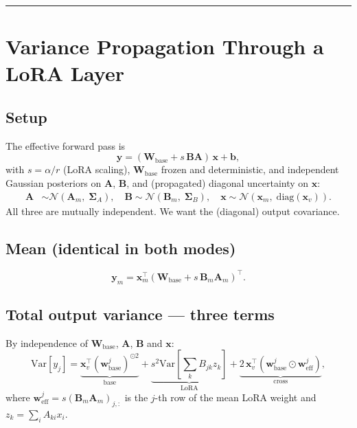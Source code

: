 \documentclass[11pt]{article}
\newcommand{\Var}{\mathrm{Var}}
\newcommand{\diag}{\mathrm{diag}}
\begin{document}
\bigskip\hrule\bigskip

\section{Variance Propagation Through a LoRA Layer}

\subsection{Setup}

The effective forward pass is
\begin{equation}
  \bm y = (\bm W_\text{base} + s\,\bm B\bm A)\,\bm x + \bm b,
\end{equation}
with $s = \alpha/r$ (LoRA scaling), $\bm W_\text{base}$ frozen and deterministic,
and independent Gaussian posteriors on $\bm A$, $\bm B$, and (propagated)
diagonal uncertainty on $\bm x$:
\begin{align*}
  \bm A &\sim \mathcal{N}(\bm A_m,\;\bm\Sigma_A), \quad
  \bm B \sim \mathcal{N}(\bm B_m,\;\bm\Sigma_B), \quad
  \bm x \sim \mathcal{N}(\bm x_m,\;\diag(\bm x_v)).
\end{align*}
All three are mutually independent. We want the (diagonal) output covariance.

\subsection{Mean (identical in both modes)}

\begin{equation}
  \bm y_m = \bm x_m^\top (\bm W_\text{base} + s\,\bm B_m\bm A_m)^\top.
\end{equation}

\subsection{Total output variance — three terms}

By independence of $\bm W_\text{base}$, $\bm A$, $\bm B$ and $\bm x$:
\begin{equation}
  \Var[y_j] = \underbrace{{\bm x_v^\top (\bm w^j_\text{base})^{\odot 2}}}_{\text{base}}
  + \underbrace{s^2 \Var[\textstyle\sum_k B_{jk} z_k]}_{\text{LoRA}}
  + \underbrace{2\,\bm x_v^\top (\bm w^j_\text{base} \odot \bm w^j_\text{eff})}_{\text{cross}},
\end{equation}
where $\bm w^j_\text{eff} = s(\bm B_m\bm A_m)_{j,:}$ is the $j$-th row of the
mean LoRA weight and $z_k = \sum_i A_{ki} x_i$.
\end{document}
